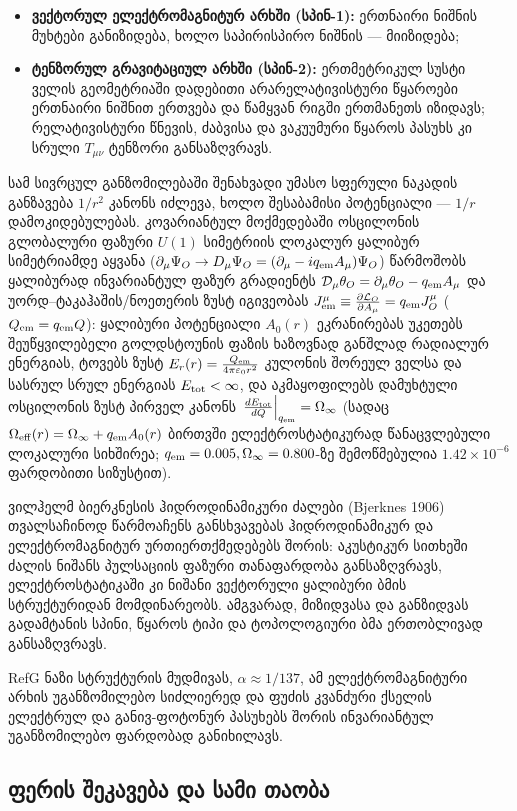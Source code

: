 \documentclass[11pt,a4paper]{article}
\begin{document}
\begin{itemize}
\item \textbf{ვექტორულ ელექტრომაგნიტურ არხში (სპინ-1):} ერთნაირი ნიშნის მუხტები განიზიდება, ხოლო საპირისპირო ნიშნის — მიიზიდება;
\item \textbf{ტენზორულ გრავიტაციულ არხში (სპინ-2):} ერთმეტრიკულ სუსტი ველის გეომეტრიაში დადებითი არარელატივისტური წყაროები ერთნაირი ნიშნით ერთვება და წამყვან რიგში ერთმანეთს იზიდავს; რელატივისტური წნევის, ძაბვისა და ვაკუუმური წყაროს პასუხს კი სრული $T_{\mu\nu}$ ტენზორი განსაზღვრავს.

\end{itemize}
სამ სივრცულ განზომილებაში შენახვადი უმასო სფერული ნაკადის განზავება $1/r^2$ კანონს იძლევა, ხოლო შესაბამისი პოტენციალი — $1/r$ დამოკიდებულებას. კოვარიანტულ მოქმედებაში ოსცილონის გლობალური ფაზური $U(1)$ სიმეტრიის ლოკალურ ყალიბურ სიმეტრიამდე აყვანა ($\partial_\mu\Psi_O \to D_\mu\Psi_O = (\partial_\mu - i q_{\rm em}A_\mu)\Psi_O$) წარმოშობს ყალიბურად ინვარიანტულ ფაზურ გრადიენტს $\mathcal{D}_\mu\theta_O = \partial_\mu\theta_O - q_{\rm em}A_\mu$ და უორდ–ტაკაჰაშის/ნოეთერის ზუსტ იგივეობას $J_{\rm em}^\mu \equiv \frac{\partial\mathcal{L}_O}{\partial A_\mu} = q_{\rm em}J_O^\mu$ ($Q_{\rm em} = q_{\rm em}Q$): ყალიბური პოტენციალი $A_0(r)$ ეკრანირებას უკეთებს შეუწყვილებელი გოლდსტოუნის ფაზის ხაზოვნად განშლად რადიალურ ენერგიას, ტოვებს ზუსტ $E_r(r) = \frac{Q_{\rm em}}{4\pi\varepsilon_0 r^2}$ კულონის შორეულ ველსა და სასრულ სრულ ენერგიას $E_{\rm tot} < \infty$, და აკმაყოფილებს დამუხტული ოსცილონის ზუსტ პირველ კანონს $\left.\frac{dE_{\rm tot}}{dQ}\right|_{q_{\rm em}} = \Omega_\infty$ (სადაც $\Omega_{\rm eff}(r) = \Omega_\infty + q_{\rm em}A_0(r)$ ბირთვში ელექტროსტატიკურად წანაცვლებული ლოკალური სიხშირეა; $q_{\rm em}=0.005, \Omega_\infty=0.800$-ზე შემოწმებულია $1.42\times 10^{-6}$ ფარდობითი სიზუსტით).

ვილჰელმ ბიერკნესის ჰიდროდინამიკური ძალები (Bjerknes 1906) თვალსაჩინოდ წარმოაჩენს განსხვავებას ჰიდროდინამიკურ და ელექტრომაგნიტურ ურთიერთქმედებებს შორის: აკუსტიკურ სითხეში ძალის ნიშანს პულსაციის ფაზური თანაფარდობა განსაზღვრავს, ელექტროსტატიკაში კი ნიშანი ვექტორული ყალიბური ბმის სტრუქტურიდან მომდინარეობს. ამგვარად, მიზიდვასა და განზიდვას გადამტანის სპინი, წყაროს ტიპი და ტოპოლოგიური ბმა ერთობლივად განსაზღვრავს.

RefG ნაზი სტრუქტურის მუდმივას, $\alpha\approx1/137$, ამ ელექტრომაგნიტური არხის უგანზომილებო სიძლიერედ და ფუძის კვანძური ქსელის ელექტრულ და განივ-ფოტონურ პასუხებს შორის ინვარიანტულ უგანზომილებო ფარდობად განიხილავს.


\subsection{ფერის შეკავება და სამი თაობა}
\end{document}
